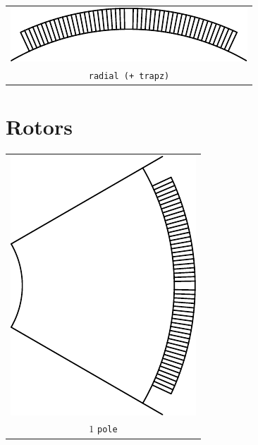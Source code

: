 \documentclass[a4paper,11pt,oneside]{report}
\begin{document}
\noindent
\begin{tabular}{c}
\includegraphics[scale=1]{../SPM/examples/magnets/radial_trapz}
\\
\texttt{radial (+ trapz)}
\end{tabular}




\newpage
\section{Rotors}
\begin{tabular}{c}
\includegraphics[scale=0.75]{../SPM/examples/rotors/1pole} 
\\
$ 1 $ \texttt{pole}
\end{tabular}
\vspace{5mm}
\end{document}
